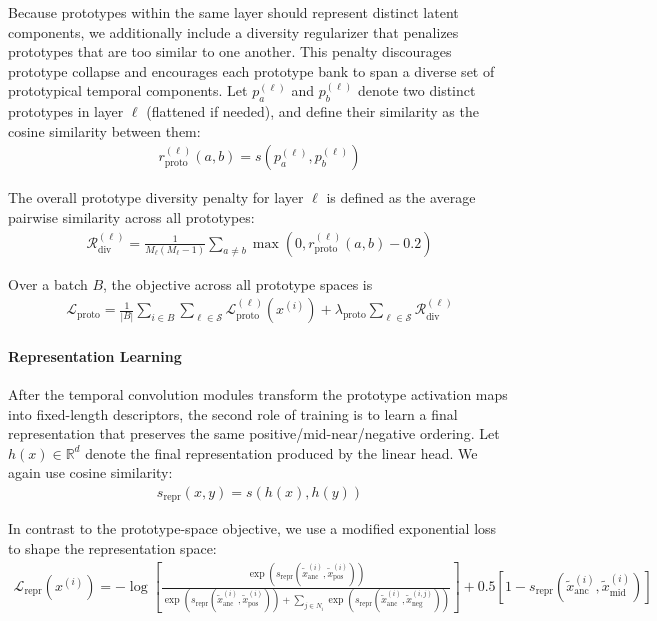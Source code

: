 \documentclass{article}
\newcommand{\R}{\mathbb R}
\begin{document}
Because prototypes within the same layer should represent distinct latent components, we additionally include a diversity regularizer that penalizes prototypes that are too similar to one another. This penalty discourages prototype collapse and encourages each prototype bank to span a diverse set of prototypical temporal components. Let $p_a^{(\ell)}$ and $p_b^{(\ell)}$ denote two distinct prototypes in layer $\ell$ (flattened if needed), and define their similarity as the cosine similarity between them:
\begin{align*}
    r_{\text{proto}}^{(\ell)}(a, b) = s\left(p_a^{(\ell)}, p_b^{(\ell)}\right)
\end{align*}

The overall prototype diversity penalty for layer $\ell$ is defined as the average pairwise similarity across all prototypes:
\begin{align*}
    \mathcal R_{\text{div}}^{(\ell)} = \frac{1}{M_\ell (M_\ell - 1)} \sum_{a \neq b} \max \left(0, r_{\text{proto}}^{(\ell)}(a, b) - 0.2\right)
\end{align*}

Over a batch $B$, the objective across all prototype spaces is 
\begin{align}
    \mathcal L_{\text{proto}} = \frac{1}{|B|} \sum_{i \in B} \sum_{\ell \in \mathcal S} \mathcal L_{\text{proto}}^{(\ell)}(x^{(i)}) + \lambda_{\text{proto}} \sum_{\ell \in \mathcal S} \mathcal R_{\text{div}}^{(\ell)}
\end{align}

\paragraph{Representation Learning} After the temporal convolution modules transform the prototype activation maps into fixed-length descriptors, the second role of training is to learn a final representation that preserves the same positive/mid-near/negative ordering. Let $h(x) \in \R^d$ denote the final representation produced by the linear head. We again use cosine similarity: 
\begin{align*}
    s_{\text{repr}}(x, y) = s\left(h(x), h(y)\right)
\end{align*}

In contrast to the prototype-space objective, we use a modified exponential loss to shape the representation space: 
\begin{align*}
    \mathcal L_{\text{repr}}(x^{(i)}) = -\log \left[ \frac{\exp \left( s_{\text{repr}} \left(\tilde x_{\text{anc}}^{(i)}, \tilde x_{\text{pos}}^{(i)}\right) \right)}{\exp \left( s_{\text{repr}} \left(\tilde x_{\text{anc}}^{(i)}, \tilde x_{\text{pos}}^{(i)}\right) \right) + \sum_{j \in N_i} \exp \left( s_{\text{repr}} \left(\tilde x_{\text{anc}}^{(i)}, \tilde x_{\text{neg}}^{(i, j)}\right) \right)} \right] + 0.5\left[1 - s_{\text{repr}} \left(\tilde x_{\text{anc}}^{(i)}, \tilde x_{\text{mid}}^{(i)}\right)\right]
\end{align*}
\end{document}
